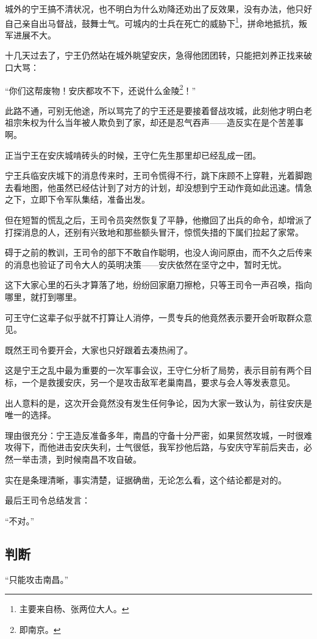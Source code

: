 \begin{multicols}{\theparacolNo}
城外的宁王搞不清状况，也不明白为什么劝降还劝出了反效果，没有办法，他只好自己亲自出马督战，鼓舞士气。可城内的士兵在死亡的威胁下\footnote{主要来自杨、张两位大人。}，拼命地抵抗，叛军进展不大。

十几天过去了，宁王仍然站在城外眺望安庆，急得他团团转，只能把刘养正找来破口大骂：

“你们这帮废物！安庆都攻不下，还说什么金陵\footnote{即南京。}！”

此路不通，可别无他途，所以骂完了的宁王还是要接着督战攻城，此刻他才明白老祖宗朱权为什么当年被人欺负到了家，却还是忍气吞声——造反实在是个苦差事啊。

正当宁王在安庆城啃砖头的时候，王守仁先生那里却已经乱成一团。

宁王兵临安庆城下的消息传来时，王司令慌得不行，跳下床顾不上穿鞋，光着脚跑去看地图，他虽然已经估计到了对方的计划，却没想到宁王动作竟如此迅速。情急之下，立即下令军队集结，准备出发。

但在短暂的慌乱之后，王司令员突然恢复了平静，他撤回了出兵的命令，却增派了打探消息的人，还别有兴致地和那些额头冒汗，惊慌失措的下属们拉起了家常。

碍于之前的教训，王司令的部下不敢自作聪明，也没人询问原由，而不久之后传来的消息也验证了司令大人的英明决策——安庆依然在坚守之中，暂时无忧。

这下大家心里的石头才算落了地，纷纷回家磨刀擦枪，只等王司令一声召唤，指向哪里，就打到哪里。

可王守仁这辈子似乎就不打算让人消停，一贯专兵的他竟然表示要开会听取群众意见。

既然王司令要开会，大家也只好跟着去凑热闹了。

这是宁王之乱中最为重要的一次军事会议，王守仁分析了局势，表示目前有两个目标，一个是救援安庆，另一个是攻击敌军老巢南昌，要求与会人等发表意见。

出人意料的是，这次开会竟然没有发生任何争论，因为大家一致认为，前往安庆是唯一的选择。

理由很充分：宁王造反准备多年，南昌的守备十分严密，如果贸然攻城，一时很难攻得下，而他进击安庆失利，士气很低，我军抄他后路，与安庆守军前后夹击，必然一举击溃，到时候南昌不攻自破。

实在是条理清晰，事实清楚，证据确凿，无论怎么看，这个结论都是对的。

最后王司令总结发言：

“不对。”

\subsection{判断}
“只能攻击南昌。”


\end{multicols}
